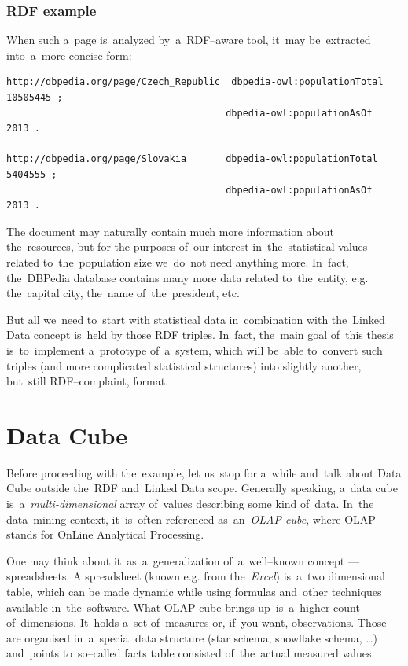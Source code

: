 \subsubsection{RDF example}

When such a~page is~analyzed by~a~RDF--aware tool, it~may be~extracted into~a~more concise form:

\scriptsize\begin{verbatim}
http://dbpedia.org/page/Czech_Republic	dbpedia-owl:populationTotal		10505445 ;
                                       dbpedia-owl:populationAsOf		2013 .

http://dbpedia.org/page/Slovakia       dbpedia-owl:populationTotal		5404555 ;
                                       dbpedia-owl:populationAsOf		2013 .
\end{verbatim}\normalsize

The document may naturally contain much more information about the~resources, but for the
purposes of~our interest in~the~statistical values related to~the~population size we~do~not
need anything more. In~fact, the~DBPedia database contains many more data related to~the~entity,
e.g. the~capital city, the~name of~the~president, etc.

But all we~need to~start with statistical data in~combination with the~Linked Data concept is~held
by those RDF triples. In~fact, the~main goal of~this thesis is~to~implement a~prototype of~a~system, which will be~able to~convert such triples (and more complicated statistical structures) into
slightly another, but~still RDF--complaint, format.

\section{Data Cube}
\label{sec:datacube}
Before proceeding with the~example, let us~stop for a~while and~talk about Data Cube outside
the~RDF and~Linked Data scope. Generally speaking, a~data cube is~a~\emph{multi-dimensional}
 array of~values describing some kind of~data. In~the
data--mining context, it~is~often referenced as~an~\emph{OLAP cube}, where OLAP stands for OnLine
Analytical Processing.

One may think about it~as~a~generalization of~a~well--known concept --- spreadsheets.
A spreadsheet (known e.g. from the~\emph{Excel}) is~a~two dimensional table, which can be
made dynamic while using formulas and~other techniques available in~the~software. What
OLAP cube brings up~is~a~higher count of~dimensions. It~holds a~set of~measures or, if~you
want, observations. Those are organised in~a~special data structure (star schema, snowflake
schema, …) and~points to~so--called facts table consisted of~the~actual measured values.

